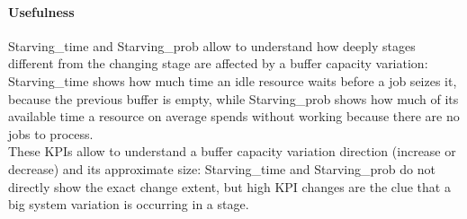 \paragraph{Usefulness}
Starving\_time and Starving\_prob allow to understand how deeply stages different from the changing stage are affected by a buffer capacity variation: Starving\_time shows how much time an idle resource waits before a job seizes it, because the previous buffer is empty, while Starving\_prob shows how much of its available time a resource on average spends without working because there are no jobs to process.\\
These KPIs allow to understand a buffer capacity variation direction (increase or decrease) and its approximate size: Starving\_time and Starving\_prob do not directly show the exact change extent, but high KPI changes are the clue that a big system variation is occurring in a stage.
